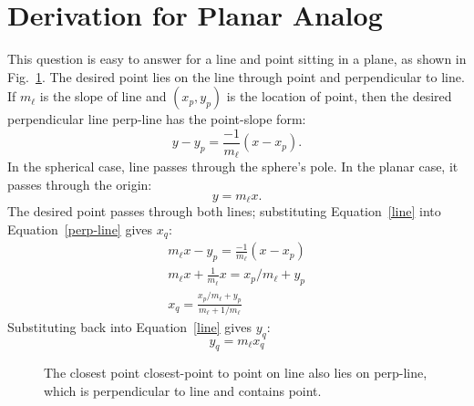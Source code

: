 \section*{Derivation for Planar Analog}
This question is easy to answer for a line and point sitting in a plane, as shown in Fig.~\ref{closest-point}. The desired point lies on the line through \acs{point} and perpendicular to \acs{line}. If $m_\ell$ is the slope of \acs{line} and $(x_p,y_p)$ is the location of \acs{point}, then the desired perpendicular line \acs{perp-line} has the point-slope form:
\begin{equation}
    y-y_p=\frac{-1}{m_\ell}\left(x-x_p\right).\label{perp-line}
\end{equation}
In the spherical case, \acs{line} passes through the sphere's pole. In the planar case, it passes through the origin:
\begin{equation}
    y=m_\ell x.\label{line}
\end{equation}
The desired point passes through both lines; substituting Equation~\ref{line} into Equation~\ref{perp-line} gives $x_q$:
\begin{gather}
    m_\ell x-y_p=\frac{-1}{m_\ell}\left(x-x_p\right)\nonumber\\
    m_\ell x+\frac{1}{m_\ell}x=x_p/m_\ell+y_p\nonumber\\
    \boxed{x_q=\frac{x_p/m_\ell+y_p}{m_\ell+1/m_\ell}}\label{x}
\end{gather}
Substituting back into Equation~\ref{line} gives $y_q$:
\begin{equation}
    \boxed{y_q=m_\ell x_q}\label{y}
\end{equation}
\begin{figure}
    {\centering
    \caption[Closest point on a line to another point in the plane.]{The closest point \acs{closest-point} to \acs{point} on \acs{line} also lies on \acs{perp-line}, which is perpendicular to \acs{line} and contains \acs{point}.}
    \label{closest-point}
    }
\end{figure}
